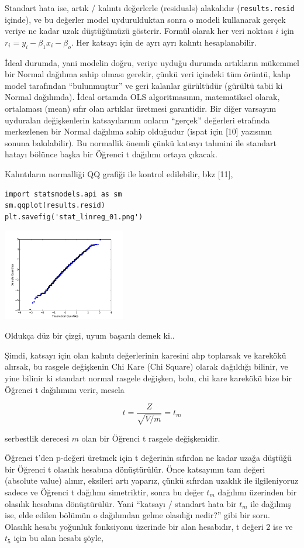 \documentclass[12pt,fleqn]{article}\usepackage{../../common}
\begin{document}
Standart hata ise, artık / kalıntı değerlerle (residuals) alakalıdır
(\verb!results.resid! içinde), ve bu değerler model uydurulduktan sonra o modeli
kullanarak gerçek veriye ne kadar uzak düştüğümüzü gösterir. Formül olarak her
veri noktası $i$ için $r_i = y_i - \beta_1x_i - \beta_o$. Her katsayı için de
ayrı ayrı kalıntı hesaplanabilir.

İdeal durumda, yani modelin doğru, veriye uyduğu durumda artıkların
mükemmel bir Normal dağılıma sahip olması gerekir, çünkü veri içindeki tüm
örüntü, kalıp model tarafından ``bulunmuştur'' ve geri kalanlar gürültüdür
(gürültü tabii ki Normal dağılımda). İdeal ortamda OLS algoritmasının,
matematiksel olarak, ortalaması (mean) sıfır olan artıklar üretmesi
garantidir. Bir diğer varsayım uyduralan değişkenlerin katsayılarının
onların ``gerçek'' değerleri etrafında merkezlenen bir Normal dağılıma
sahip olduğudur (ispat için [10] yazısının sonuna bakılabilir). Bu
normallik önemli çünkü katsayı tahmini ile standart hatayı bölünce başka
bir Öğrenci t dağılımı ortaya çıkacak.

Kalıntıların normalliği QQ grafiği ile kontrol edilebilir, bkz [11],

\begin{verbatim}
import statsmodels.api as sm
sm.qqplot(results.resid)
plt.savefig('stat_linreg_01.png')
\end{verbatim}

\includegraphics[height=4cm]{stat_linreg_01.png}

Oldukça düz bir çizgi, uyum başarılı demek ki..

Şimdi, katsayı için olan kalıntı değerlerinin karesini alıp toplarsak ve
karekökü alırsak, bu rasgele değişkenin Chi Kare (Chi Square) olarak
dağıldığı bilinir, ve yine bilinir ki standart normal rasgele değişken,
bolu, chi kare karekökü bize bir Öğrenci t dağılımını verir, mesela

$$ t = \frac{Z}{\sqrt{V / m}} = t_m$$

serbestlik derecesi $m$ olan bir Öğrenci t rasgele değişkenidir. 

Öğrenci t'den p-değeri üretmek için t değerinin sıfırdan ne kadar uzağa düştüğü
bir Öğrenci t olasılık hesabına dönüştürülür. Önce katsayının tam değeri
(absolute value) alınır, eksileri artı yaparız, çünkü sıfırdan uzaklık ile
ilgileniyoruz sadece ve Öğrenci t dağılımı simetriktir, sonra bu değer $t_m$
dağılımı üzerinden bir olasılık hesabına dönüştürülür. Yani ``katsayı / standart
hata bir $t_m$ ile dağılmış ise, elde edilen bölümün o dağılımdan gelme
olasılığı nedir?'' gibi bir soru. Olasılık hesabı yoğunluk fonksiyonu üzerinde
bir alan hesabıdır, t değeri 2 ise ve $t_5$ için bu alan hesabı şöyle,
\end{document}
